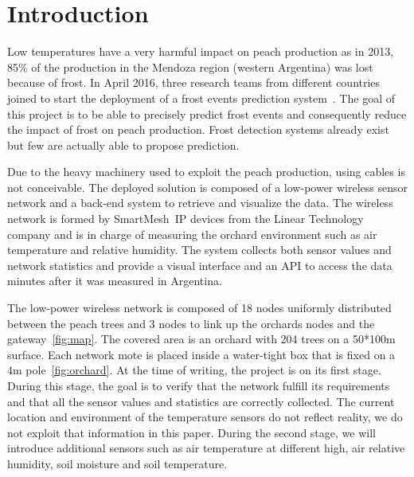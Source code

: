 \documentclass{sig-alternate}
\newcommand{\smip}           {SmartMesh~IP\xspace}
\begin{document}
\section{Introduction}
\label{sec:intro}


Low temperatures have a very harmful impact on peach production as in 2013, 85\% of the production in the Mendoza region (western Argentina) was lost because of frost.
In April 2016, three research teams from different countries joined to start the deployment of a frost events prediction system~\cite{watteyne16peach}.
The goal of this project is to be able to precisely predict frost events and consequently reduce the impact of frost on peach production.
Frost detection systems already exist but few are actually able to propose prediction.


Due to the heavy machinery used to exploit the peach production, using cables is not conceivable.
The deployed solution is composed of a low-power wireless sensor network and a back-end system to retrieve and visualize the data.
The wireless network is formed by \smip devices from the Linear Technology company and is in charge of measuring the orchard environment such as air temperature and relative humidity.
The system collects both sensor values and network statistics and provide a visual interface and an API to access the data minutes after it was measured in Argentina.


The low-power wireless network is composed of 18 nodes uniformly distributed between the peach trees and 3 nodes to link up the orchards nodes and the gateway~\ref{fig:map}.
The covered area is an orchard with 204 trees on a 50*100m surface.
Each network mote is placed inside a water-tight box that is fixed on a 4m pole~\ref{fig:orchard}.
At the time of writing, the project is on its first stage.
During this stage, the goal is to verify that the network fulfill its requirements and that all the sensor values and statistics are correctly collected.
The current location and environment of the temperature sensors do not reflect reality, we do not exploit that information in this paper.
During the second stage, we will introduce additional sensors such as air temperature at different high, air relative humidity, soil moisture and soil temperature.
\end{document}

